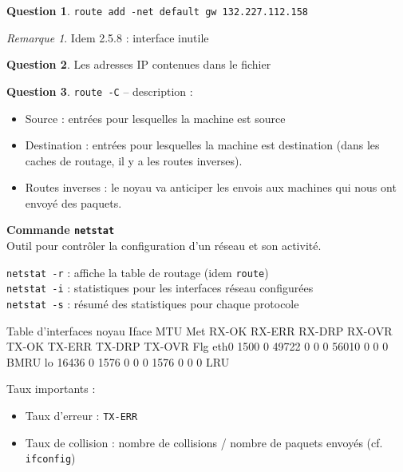 \documentclass[11pt,english,french]{scrreprt}
\theoremstyle{remark}
\newtheorem*{rem*}{Remarque}
\theoremstyle{definition}
\newtheorem{ques*}{Question}[subsection]
\begin{document}
\begin{ques*}
	\lstinline!route add -net default gw 132.227.112.158!
	\begin{rem*}
		Idem 2.5.8 : interface inutile
	\end{rem*}
\end{ques*}

\begin{ques*}
Les adresses IP contenues dans le fichier 
\end{ques*}


\begin{ques*}
\lstinline!route -C! -- description : \begin{itemize}
	\item Source : entrées pour lesquelles la machine est source
	\item Destination : entrées pour lesquelles la machine est destination (dans les caches de routage, il y a les routes inverses).
	\item Routes inverses : le noyau va anticiper les envois aux machines qui nous ont envoyé des paquets.
\end{itemize}

\end{ques*}

\textbf{Commande \lstinline!netstat!}\\
Outil pour contrôler la configuration d'un réseau et son activité.

\lstinline!netstat -r! : affiche la table de routage (idem \lstinline!route!)\\
\lstinline!netstat -i! : statistiques pour les interfaces réseau configurées\\
\lstinline!netstat -s! : résumé des statistiques pour chaque protocole

\begin{verbatimtab}
Table d'interfaces noyau
Iface       MTU Met    RX-OK RX-ERR RX-DRP RX-OVR    TX-OK TX-ERR TX-DRP TX-OVR Flg
eth0       1500   0    49722      0      0      0    56010      0      0      0 BMRU
lo        16436   0     1576      0      0      0     1576      0      0      0 LRU
\end{verbatimtab}

Taux importants :\begin{itemize}
	\item Taux d'erreur : \lstinline!TX-ERR!
	\item Taux de collision : nombre de collisions / nombre de paquets envoyés (cf. \lstinline!ifconfig!)
\end{itemize}
\end{document}
